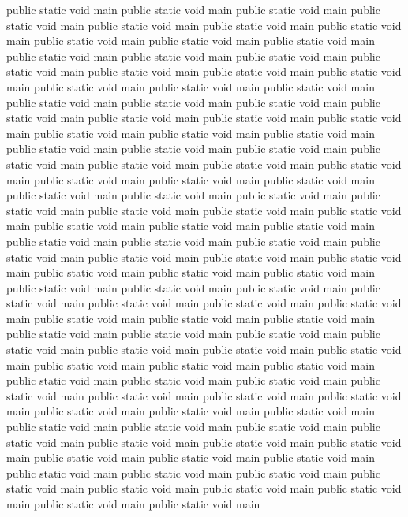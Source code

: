 \documentclass[12pt]{article}
\begin{document}
public static void main
public static void main
public static void main
public static void main
public static void main
public static void main
public static void main
public static void main
public static void main
public static void main
public static void main
public static void main
public static void main
public static void main
public static void main
public static void main
public static void main
public static void main
public static void main
public static void main
public static void main
public static void main
public static void main
public static void main
public static void main
public static void main
public static void main
public static void main
public static void main
public static void main
public static void main
public static void main
public static void main
public static void main
public static void main
public static void main
public static void main
public static void main
public static void main
public static void main
public static void main
public static void main
public static void main
public static void main
public static void main
public static void main
public static void main
public static void main
public static void main
public static void main
public static void main
public static void main
public static void main
public static void main
public static void main
public static void main
public static void main
public static void main
public static void main
public static void main
public static void main
public static void main
public static void main
public static void main
public static void main
public static void main
public static void main
public static void main
public static void main
public static void main
public static void main
public static void main
public static void main
public static void main
public static void main
public static void main
public static void main
public static void main
public static void main
public static void main
public static void main
public static void main
public static void main
public static void main
public static void main
public static void main
public static void main
public static void main
public static void main
public static void main
public static void main
public static void main
public static void main
public static void main
public static void main
public static void main
public static void main
public static void main
public static void main
public static void main
public static void main
public static void main
public static void main
public static void main
public static void main
public static void main
public static void main
public static void main
public static void main
\end{document}
